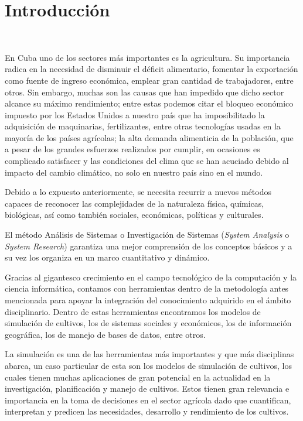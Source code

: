 \chapter*{Introducción}\label{chapter:introduction}
\

En Cuba uno de los sectores más importantes es la agricultura. Su importancia radica en la necesidad de disminuir el déficit alimentario, fomentar la exportación como fuente de ingreso económica, emplear gran cantidad de trabajadores, entre otros. Sin embargo, muchas son las causas que han impedido que dicho sector alcance su máximo rendimiento; entre estas podemos citar el bloqueo económico impuesto por los Estados Unidos a nuestro país que ha imposibilitado la adquisición de maquinarias, fertilizantes, entre otras tecnologías usadas en la mayoría de los países agrícolas; la alta demanda alimenticia de la población, que a pesar de los grandes esfuerzos realizados por cumplir, en ocasiones es complicado satisfacer y las condiciones del clima que se han acuciado debido al impacto del cambio climático, no solo en nuestro país sino en el mundo.

Debido a lo expuesto anteriormente, se necesita recurrir a nuevos métodos capaces de reconocer las complejidades de la naturaleza física, químicas, biológicas, así como también sociales, económicas, políticas y culturales.

El método Análisis de Sistemas o Investigación de Sistemas (\textit{System Analysis} o \textit{System Research}) garantiza una mejor comprensión de los conceptos básicos y a su vez los organiza en un marco cuantitativo y dinámico.

Gracias al gigantesco crecimiento en el campo tecnológico de la computación y la ciencia informática, contamos con herramientas dentro de la metodología antes mencionada para apoyar la integración del conocimiento adquirido en el ámbito disciplinario. Dentro de estas herramientas encontramos los modelos de simulación de cultivos, los de sistemas sociales y económicos, los de información geográfica, los de manejo de bases de datos, entre otros.

La simulación es una de las herramientas más importantes y que más disciplinas abarca, un caso particular de esta son los modelos de simulación de cultivos, los cuales tienen muchas aplicaciones de gran potencial en la actualidad en la investigación, planificación y manejo de cultivos. Estos tienen gran relevancia e importancia en la toma de decisiones en el sector agrícola dado que cuantifican, interpretan y predicen las necesidades, desarrollo y rendimiento de los cultivos.

